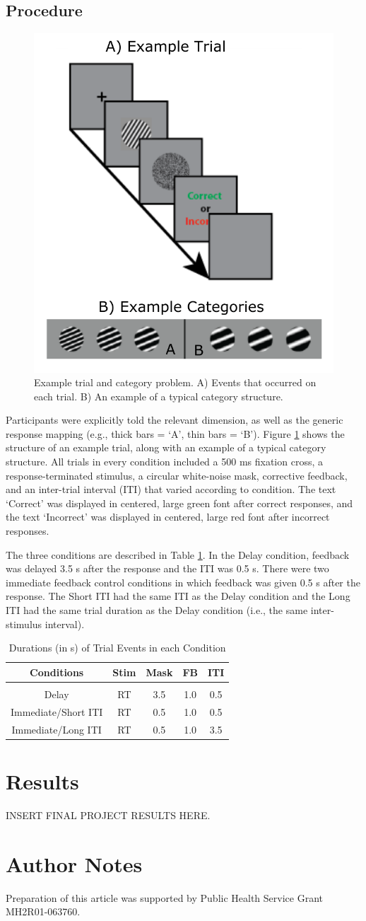 \documentclass[jou,apacite]{apa6}
\begin{document}
\subsection{Procedure}
\begin{figure}
  \centering
  \includegraphics[width=.35\textwidth]{figures/Cats.pdf}
  \caption{Example trial and category problem. A) Events that occurred on each
    trial. B) An example of a typical category structure.}
  \label{trial}
\end{figure}

Participants were explicitly told the relevant dimension, as well as the generic
response mapping (e.g., thick bars = `A', thin bars = `B'). Figure \ref{trial}
shows the structure of an example trial, along with an example of a typical
category structure. All trials in every condition included a 500 ms fixation
cross, a response-terminated stimulus, a circular white-noise mask, corrective
feedback, and an inter-trial interval (ITI) that varied according to condition.
The text `Correct' was displayed in centered, large green font after correct
responses, and the text `Incorrect' was displayed in centered, large red font
after incorrect responses.

The three conditions are described in Table \ref{conditions}. In the Delay
condition, feedback was delayed 3.5 s after the response and the ITI was 0.5 s.
There were two immediate feedback control conditions in which feedback was given
0.5 s after the response. The Short ITI had the same ITI as the Delay condition
and the Long ITI had the same trial duration as the Delay condition (i.e., the
same inter-stimulus interval).

\begin{table}
    \caption{Durations (in s) of Trial Events in each Condition}
    \label{conditions}
    \begin{tabular}{c|cccc}
      Conditions & Stim & Mask & FB & ITI \\[0.5ex]
      \hline\\[-1.5ex]
      Delay & RT & 3.5 & 1.0 & 0.5 \\[0.5ex]
      \hline
      Immediate/Short ITI & RT & 0.5 & 1.0 & 0.5 \\[0.5ex]
      \hline
      Immediate/Long ITI & RT & 0.5 & 1.0 & 3.5 \\[0.5ex]
    \end{tabular}
\end{table}

\section{Results}
INSERT FINAL PROJECT RESULTS HERE.



\section{Author Notes}
Preparation of this article was supported by Public Health Service Grant
MH2R01-063760.
\end{document}
